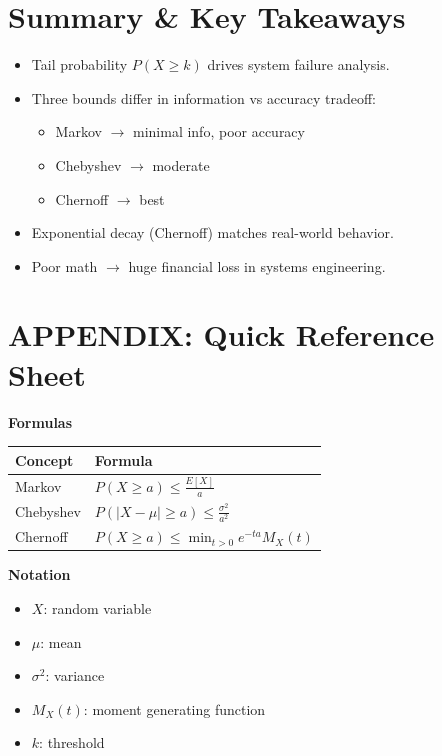 \documentclass[11pt]{article}
\begin{document}
\section{Summary \& Key Takeaways}
\begin{itemize}
    \item Tail probability $P(X \ge k)$ drives system failure analysis.
    \item Three bounds differ in information vs accuracy tradeoff:
    \begin{itemize}
        \item Markov $\rightarrow$ minimal info, poor accuracy
        \item Chebyshev $\rightarrow$ moderate
        \item Chernoff $\rightarrow$ best
    \end{itemize}
    \item Exponential decay (Chernoff) matches real-world behavior.
    \item Poor math $\rightarrow$ huge financial loss in systems engineering.
\end{itemize}

\newpage

\section*{APPENDIX: Quick Reference Sheet}

\textbf{Formulas}
\vspace{0.3cm}

\noindent
\renewcommand{\arraystretch}{1.5}
\begin{tabular}{|l|l|}
\hline
\textbf{Concept} & \textbf{Formula} \\
\hline
Markov & $P(X \ge a) \le \frac{E[X]}{a}$ \\
\hline
Chebyshev & $P(|X - \mu| \ge a) \le \frac{\sigma^2}{a^2}$ \\
\hline
Chernoff & $P(X \ge a) \le \min_{t>0} e^{-ta} M_X(t)$ \\
\hline
\end{tabular}

\vspace{0.5cm}
\textbf{Notation}
\begin{itemize}
    \item $X$: random variable
    \item $\mu$: mean
    \item $\sigma^2$: variance
    \item $M_X(t)$: moment generating function
    \item $k$: threshold
\end{itemize}
\end{document}
